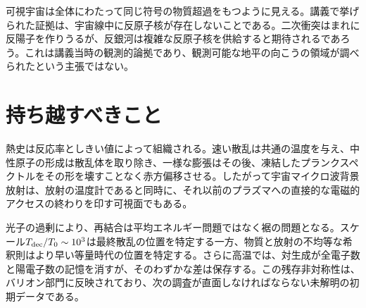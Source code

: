 可視宇宙は全体にわたって同じ符号の物質超過をもつように見える。講義で挙げられた証拠は、宇宙線中に反原子核が存在しないことである。二次衝突はまれに反陽子を作りうるが、反銀河は複雑な反原子核を供給すると期待されるであろう。これは講義当時の観測的論拠であり、観測可能な地平の向こうの領域が調べられたという主張ではない。

\begin{classroomqa}
\end{classroomqa}

\begin{classroomqa}
\end{classroomqa}

\section{持ち越すべきこと}

熱史は反応率としきい値によって組織される。速い散乱は共通の温度を与え、中性原子の形成は散乱体を取り除き、一様な膨張はその後、凍結したプランクスペクトルをその形を壊すことなく赤方偏移させる。したがって宇宙マイクロ波背景放射は、放射の温度計であると同時に、それ以前のプラズマへの直接的な電磁的アクセスの終わりを印す可視面でもある。

光子の過剰により、再結合は平均エネルギー問題ではなく裾の問題となる。スケール\(T_{\rm dec}/T_0\sim10^3\)は最終散乱の位置を特定する一方、物質と放射の不均等な希釈則はより早い等量時代の位置を特定する。さらに高温では、対生成が全電子数と陽電子数の記憶を消すが、そのわずかな差は保存する。この残存非対称性は、バリオン部門に反映されており、次の調査が直面しなければならない未解明の初期データである。
